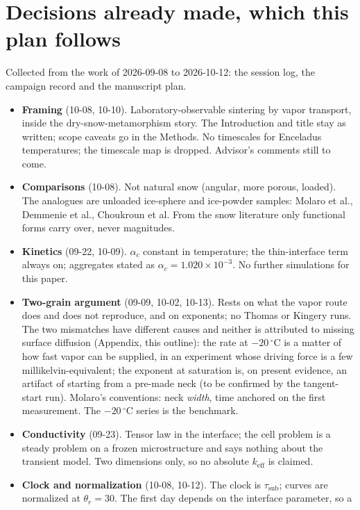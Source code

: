 \documentclass[11pt]{article}
\begin{document}
\section*{Decisions already made, which this plan follows}

Collected from the work of 2026-09-08 to 2026-10-12: the session log, the
campaign record and the manuscript plan.
\begin{itemize}
\item \textbf{Framing} (10-08, 10-10). Laboratory-observable sintering by
  vapor transport, inside the dry-snow-metamorphism story. The Introduction
  and title stay as written; scope caveats go in the Methods. No timescales
  for Enceladus temperatures; the timescale map is dropped. Advisor's
  comments still to come.
\item \textbf{Comparisons} (10-08). Not natural snow (angular, more porous,
  loaded). The analogues are unloaded ice-sphere and ice-powder samples:
  Molaro et al., Demmenie et al., Choukroun et al. From the snow literature
  only functional forms carry over, never magnitudes.
\item \textbf{Kinetics} (09-22, 10-09). $\alpha_c$ constant in temperature;
  the thin-interface term always on; aggregates stated as $\alpha_c = 1.020
  \times 10^{-3}$. No further simulations for this paper.
\item \textbf{Two-grain argument} (09-09, 10-02, 10-13). Rests on what the
  vapor route does and does not reproduce, and on exponents; no Thomas or
  Kingery runs. The two mismatches have different causes and neither is
  attributed to missing surface diffusion (Appendix, this outline): the rate
  at $-20\,^{\circ}$C is a matter of how fast vapor can be supplied, in an
  experiment whose driving force is a few millikelvin-equivalent; the
  exponent at saturation is, on present evidence, an artifact of starting
  from a pre-made neck (to be confirmed by the tangent-start run). Molaro's conventions: neck \emph{width}, time anchored on the first
  measurement. The $-20\,^{\circ}$C series is the benchmark.
\item \textbf{Conductivity} (09-23). Tensor law in the interface; the cell
  problem is a steady problem on a frozen microstructure and says nothing
  about the transient model. Two dimensions only, so no absolute
  $k_{\mathrm{eff}}$ is claimed.
\item \textbf{Clock and normalization} (10-08, 10-12). The clock is
  $\tau_{\mathrm{sub}}$; curves are normalized at $\theta_r = 30$. The first day depends on the interface parameter, so a

\end{itemize}
\end{document}
